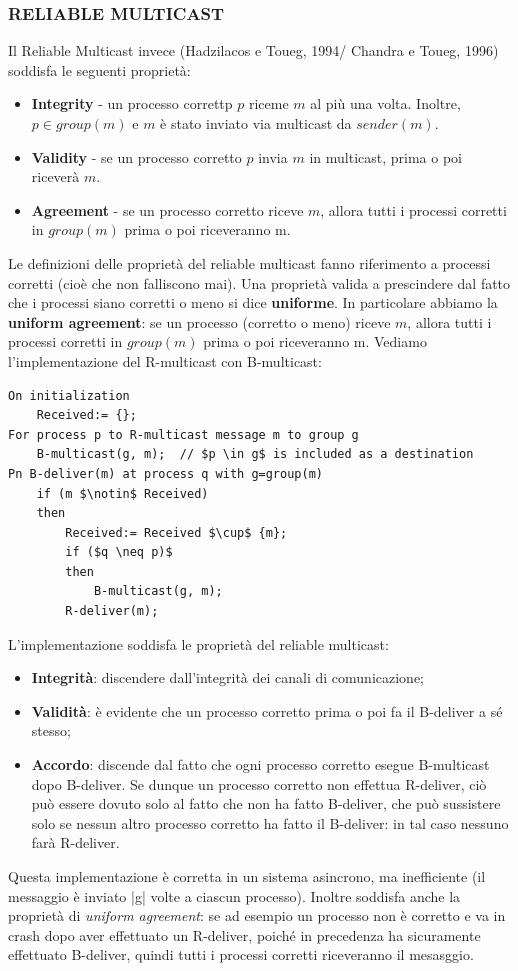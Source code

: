 \subsubsection{RELIABLE MULTICAST}
Il Reliable Multicast invece (Hadzilacos e Toueg, 1994/ Chandra e Toueg, 1996) soddisfa le seguenti proprietà:
\begin{itemize}
    \item \textbf{Integrity} - un processo correttp $p$ riceme $m$ al più una volta. Inoltre, $p \in group(m)$ e $m$ è stato inviato via multicast da $sender(m)$.
    \item \textbf{Validity} - se un processo corretto $p$ invia $m$ in multicast, prima o poi riceverà $m$.
    \item \textbf{Agreement} - se un processo corretto riceve $m$, allora tutti i processi corretti in $group(m)$ prima o poi riceveranno m. 
\end{itemize}    
Le definizioni delle proprietà del reliable multicast fanno riferimento a processi corretti (cioè che non falliscono mai). Una proprietà valida a prescindere dal fatto che i processi siano corretti o meno si dice \textbf{uniforme}. In particolare abbiamo la \textbf{uniform agreement}: se un processo (corretto o meno) riceve $m$, allora tutti i processi corretti in $group(m)$ prima o poi riceveranno m. 
Vediamo l'implementazione del R-multicast con B-multicast:
\begin{lstlisting}[mathescape=true]
On initialization
    Received:= {};
For process p to R-multicast message m to group g
    B-multicast(g, m);  // $p \in g$ is included as a destination
Pn B-deliver(m) at process q with g=group(m)
    if (m $\notin$ Received)
    then
        Received:= Received $\cup$ {m};
        if ($q \neq p)$
        then
            B-multicast(g, m);
        R-deliver(m);
\end{lstlisting}
L'implementazione soddisfa le proprietà del reliable multicast:
\begin{itemize}
    \item \textbf{Integrità}: discendere dall'integrità dei canali di comunicazione; 
    \item \textbf{Validità}: è evidente che un processo corretto prima o poi fa il B-deliver a sé stesso;
    \item \textbf{Accordo}: discende dal fatto che ogni processo corretto esegue B-multicast dopo B-deliver. Se dunque un processo corretto non effettua R-deliver, ciò può essere dovuto solo al fatto che non ha fatto B-deliver, che può sussistere solo se nessun altro processo corretto ha fatto il B-deliver: in tal caso nessuno farà R-deliver.
\end{itemize}
Questa implementazione è corretta in un sistema asincrono, ma inefficiente (il messaggio è inviato |g| volte a ciascun processo). Inoltre soddisfa anche la proprietà di \textit{uniform agreement}: se ad esempio un processo non è corretto e va in crash dopo aver effettuato un R-deliver, poiché in precedenza ha sicuramente effettuato B-deliver, quindi tutti i processi corretti riceveranno il mesasggio.

